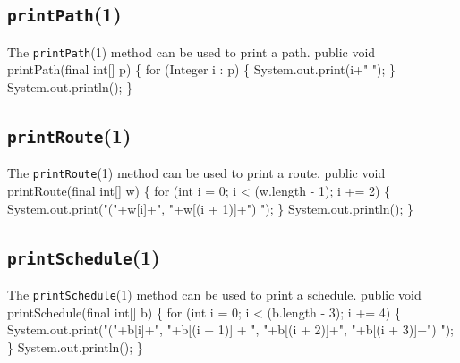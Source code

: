 \subsection{{\tt{}\protect{}printPath}(1)}
The {\tt{}\protect{}printPath}(1) method can be used to print a path.
\nwenddocs{}\endmoddef{}
public void printPath(final int[] p) \{
  for (Integer i : p) \{
    System.out.print(i+" ");
  \}
  System.out.println();
\}
\eatline
{}\nwendcode{}\nwdocspar
\subsection{{\tt{}\protect{}printRoute}(1)}
The {\tt{}\protect{}printRoute}(1) method can be used to print a route.
\nwenddocs{}\endmoddef{}
public void printRoute(final int[] w) \{
  for (int i = 0; i < (w.length - 1); i += 2) \{
    System.out.print("("+w[i]+", "+w[(i + 1)]+") ");
  \}
  System.out.println();
\}
\eatline
{}\nwendcode{}\nwdocspar
\subsection{{\tt{}\protect{}printSchedule}(1)}
The {\tt{}\protect{}printSchedule}(1) method can be used to print a schedule.
\nwenddocs{}\endmoddef{}
public void printSchedule(final int[] b) \{
  for (int i = 0; i < (b.length - 3); i += 4) \{
    System.out.print("("+b[i]+", "+b[(i + 1)]
      + ", "+b[(i + 2)]+", "+b[(i + 3)]+") ");
  \}
  System.out.println();
\}
\eatline
{}\nwendcode{}\nwdocspar
